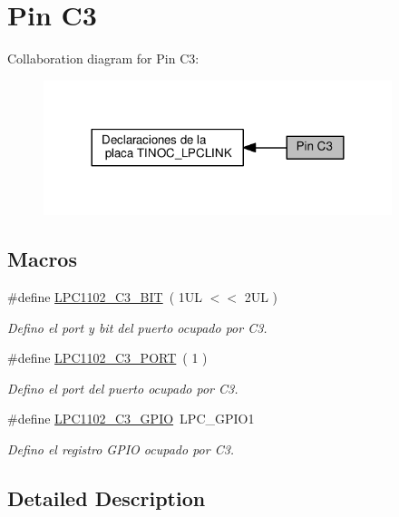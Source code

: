 \hypertarget{group___p_i_n_c3}{}\section{Pin C3}
\label{group___p_i_n_c3}
Collaboration diagram for Pin C3\+:\nopagebreak
\begin{figure}[H]
\begin{center}
\leavevmode
\includegraphics[width=288pt]{group___p_i_n_c3}
\end{center}
\end{figure}
\subsection*{Macros}
\begin{DoxyCompactItemize}
\item 
\#define \hyperlink{group___p_i_n_c3_ga9d9663e63d678743aeb834bbff7c7aed}{L\+P\+C1102\+\_\+\+C3\+\_\+\+B\+IT}~( 1\+U\+L $<$$<$ 2\+U\+L )
\begin{DoxyCompactList}\small\item\em Defino el port y bit del puerto ocupado por C3. \end{DoxyCompactList}\item 
\#define \hyperlink{group___p_i_n_c3_ga7a5850ce0680199eef3742f80e5e8c85}{L\+P\+C1102\+\_\+\+C3\+\_\+\+P\+O\+RT}~( 1 )
\begin{DoxyCompactList}\small\item\em Defino el port del puerto ocupado por C3. \end{DoxyCompactList}\item 
\#define \hyperlink{group___p_i_n_c3_gaee995322210bd5ce83ebe39b13dbd6bf}{L\+P\+C1102\+\_\+\+C3\+\_\+\+G\+P\+IO}~L\+P\+C\+\_\+\+G\+P\+I\+O1
\begin{DoxyCompactList}\small\item\em Defino el registro G\+P\+IO ocupado por C3. \end{DoxyCompactList}\end{DoxyCompactItemize}


\subsection{Detailed Description}



